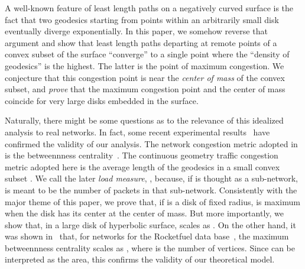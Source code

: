 \documentclass{article}
\begin{document}
A well-known feature of least length paths on a negatively curved surface is the fact that two geodesics starting from points within an arbitrarily small disk eventually diverge exponentially.  
In this paper, we somehow reverse that argument and show that least length paths departing at remote points of a convex subset  of the surface ``converge'' to a single point where the ``density of geodesics'' is the highest. The latter is the point of maximum congestion. We conjecture that this congestion point is near the {\it center of mass} of the convex subset, and {\it prove} that the maximum congestion point and the center of mass coincide for very large disks embedded in the surface. 

Naturally, there might be some questions as to the relevance of this idealized analysis to real networks. In fact, some recent experimental results~\cite{arXiv_dmitri} have confirmed the validity of our analysis. The network congestion metric adopted in~\cite{arXiv_dmitri} is the betweennness centrality~\cite{congestion_tree}. The continuous geometry traffic congestion metric adopted here is the average length of the geodesics in a small convex subset . We call the later {\it load measure}, , because, if  is thought as a sub-network,  is meant to be the number of packets in that sub-network. Consistently with the major theme of this paper, we prove that, if  is a disk of fixed radius,  is maximum when the disk has its center at the center of mass. But more importantly, we show that, in a large disk  of hyperbolic surface,  scales as . On the other hand, it was shown in~\cite{arXiv_dmitri} that, for networks for the Rocketfuel data base~\cite{rocketfuel}, the maximum betweennness centrality scales as , where  is the number of vertices. Since  can be interpreted as the area, this confirms the validity of our theoretical model. 
\end{document}
